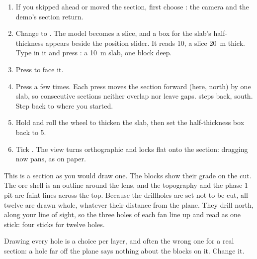\begin{tryit}
\begin{enumerate}
\item If you skipped ahead or moved the section, first choose : the camera and the demo's section return.
\item Change  to . The model becomes a slice, and a box for the slab's half-thickness appears beside the position slider. It reads 10, a slice 20~m thick. Type  in it and press : a 10~m slab, one block deep.
\item Press  to face it.
\item Press  a few times. Each press moves the section forward (here, north) by one slab, so consecutive sections neither overlap nor leave gaps. \key{,} steps back, south. Step back to where you started.
\item Hold  and roll the wheel to thicken the slab, then set the half-thickness box back to 5.
\item Tick . The view turns orthographic and locks flat onto the section: dragging now pans, as on paper.
\end{enumerate}
\end{tryit}


This is a section as you would draw one. The blocks show their grade on the cut. The ore shell is an outline around the lens, and the topography and the phase 1 pit are faint lines across the top. Because the drillholes are set not to be cut, all twelve are drawn whole, whatever their distance from the plane. They drill north, along your line of sight, so the three holes of each fan line up and read as one stick: four sticks for twelve holes.

Drawing every hole is a choice per layer, and often the wrong one for a real section: a hole far off the plane says nothing about the blocks on it. Change it.

